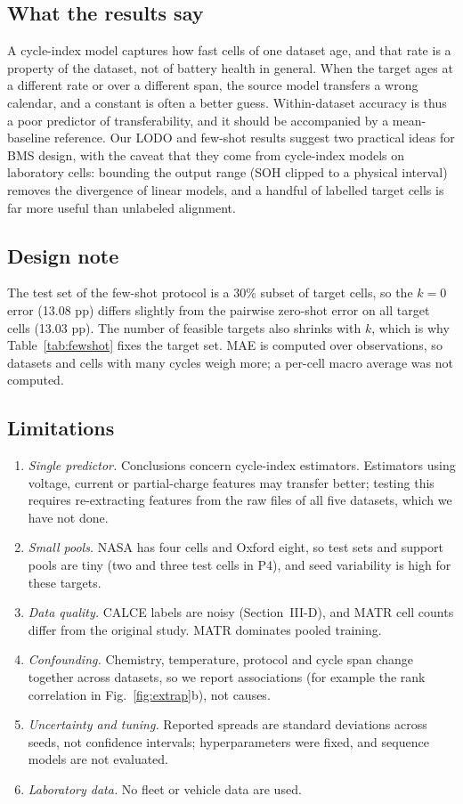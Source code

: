 \documentclass[journal]{IEEEtran}
\begin{document}
\subsection{What the results say}
A cycle-index model captures how fast cells of one dataset age, and that rate is a property of the dataset, not of battery health in general. When the target ages at a different rate or over a different span, the source model transfers a wrong calendar, and a constant is often a better guess. Within-dataset accuracy is thus a poor predictor of transferability, and it should be accompanied by a mean-baseline reference. Our LODO and few-shot results suggest two practical ideas for BMS design, with the caveat that they come from cycle-index models on laboratory cells: bounding the output range (SOH clipped to a physical interval) removes the divergence of linear models, and a handful of labelled target cells is far more useful than unlabeled alignment.

\subsection{Design note}
\label{sec:design-note}
The test set of the few-shot protocol is a 30\% subset of target cells, so the $k{=}0$ error (13.08 pp) differs slightly from the pairwise zero-shot error on all target cells (13.03 pp). The number of feasible targets also shrinks with $k$, which is why Table~\ref{tab:fewshot} fixes the target set. MAE is computed over observations, so datasets and cells with many cycles weigh more; a per-cell macro average was not computed.

\subsection{Limitations}
\label{sec:limits}
\begin{enumerate}
\item \emph{Single predictor.} Conclusions concern cycle-index estimators. Estimators using voltage, current or partial-charge features may transfer better; testing this requires re-extracting features from the raw files of all five datasets, which we have not done.
\item \emph{Small pools.} NASA has four cells and Oxford eight, so test sets and support pools are tiny (two and three test cells in P4), and seed variability is high for these targets.
\item \emph{Data quality.} CALCE labels are noisy (Section~III-D), and MATR cell counts differ from the original study. MATR dominates pooled training.
\item \emph{Confounding.} Chemistry, temperature, protocol and cycle span change together across datasets, so we report associations (for example the rank correlation in Fig.~\ref{fig:extrap}b), not causes.
\item \emph{Uncertainty and tuning.} Reported spreads are standard deviations across seeds, not confidence intervals; hyperparameters were fixed, and sequence models are not evaluated.
\item \emph{Laboratory data.} No fleet or vehicle data are used.
\end{enumerate}
\end{document}
